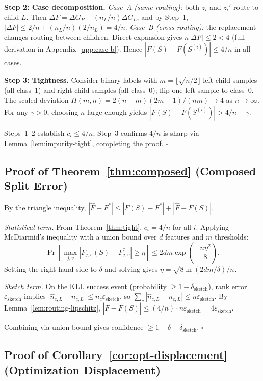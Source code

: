 \documentclass{article}
\begin{document}
\textbf{Step 2: Case decomposition.}
\textit{Case~A (same routing):} both $z_i$ and $z_i'$ route to child $L$.
Then $\Delta F = \Delta G_P - (n_L/n)\Delta G_L$, and by Step~1,
$|\Delta F| \leq 2/n + (n_L/n)(2/n_L) = 4/n$.
\textit{Case~B (cross routing):} the replacement changes routing between
children. Direct expansion gives $n|\Delta F| \leq 2 < 4$
(full derivation in Appendix~\ref{app:case-b}).
Hence $|F(S) - F(S^{(i)})| \leq 4/n$ in all cases.

\textbf{Step 3: Tightness.}
Consider binary labels with $m = \lfloor\sqrt{n/2}\rfloor$ left-child
samples (all class~1) and right-child samples (all class~0); flip one
left sample to class~0. The scaled deviation
$H(m,n) = 2(n-m)(2m-1)/(nm) \to 4$ as $n \to \infty$.
For any $\gamma > 0$, choosing $n$ large enough yields
$|F(S) - F(S^{(i)})| > 4/n - \gamma$.

Steps~1--2 establish $c_i \leq 4/n$; Step~3 confirms $4/n$ is sharp
via Lemma~\ref{lem:impurity-tight}, completing the proof. \hfill$\square$

\subsection{Proof of Theorem~\ref{thm:composed} (Composed Split Error)}
\label{app:proof-composed}

By the triangle inequality,
$|\widehat{F} - F^*| \leq |F(S) - F^*| + |\widehat{F} - F(S)|$.

\textit{Statistical term.}
From Theorem~\ref{thm:tight}, $c_i = 4/n$ for all $i$.
Applying McDiarmid's inequality with a union bound over $d$ features
and $m$ thresholds:
\[
  \Pr\!\left[\max_{j,v}|F_{j,v}(S) - F^*_{j,v}| \geq \eta\right]
  \leq 2dm\exp\!\left(-\frac{n\eta^2}{8}\right).
\]
Setting the right-hand side to $\delta$ and solving gives
$\eta = \sqrt{8\ln(2dm/\delta)/n}$.

\textit{Sketch term.}
On the KLL success event (probability $\geq 1-\delta_{\mathrm{sketch}}$),
rank error $\varepsilon_{\mathrm{sketch}}$ implies
$|\hat{n}_{c,L} - n_{c,L}| \leq n_c\varepsilon_{\mathrm{sketch}}$, so
$\sum_c|\hat{n}_{c,L} - n_{c,L}| \leq n\varepsilon_{\mathrm{sketch}}$.
By Lemma~\ref{lem:routing-lipschitz},
$|\widehat{F} - F(S)| \leq (4/n)\cdot n\varepsilon_{\mathrm{sketch}}
= 4\varepsilon_{\mathrm{sketch}}$.

Combining via union bound gives confidence $\geq 1-\delta-\delta_{\mathrm{sketch}}$.
\hfill$\square$

\subsection{Proof of Corollary~\ref{cor:opt-displacement}
           (Optimization Displacement)}
\label{app:proof-displacement}
\end{document}
